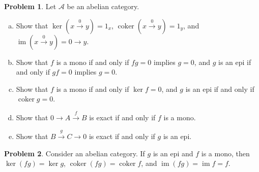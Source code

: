 \documentclass[11pt]{article}
\DeclareMathOperator{\coker}{coker}
\DeclareMathOperator{\im}{im}
\theoremstyle{definition}
\newtheorem{problem}{Problem}
\begin{document}
\vfill

\begin{problem} Let $\mathcal{A}$ be an abelian category.
	\begin{enumerate}[a)]
		\item Show that $\ker(x \xrightarrow{0} y) = 1_x$,  $\coker(x \xrightarrow{0} y) = 1_y$, and $\im(x \xrightarrow{0} y) = 0 \longrightarrow y$.
		\item Show that $f$ is a mono if and only if $fg = 0$ implies $g = 0$, and $g$ is an epi if and only if $gf = 0$ implies $g = 0$.
		\item Show that $f$ is a mono if and only if $\ker f = 0$, and $g$ is an epi if and only if $\coker g = 0$.
		\item Show that $0 \longrightarrow A \xrightarrow{\, f \,} B$ is exact if and only if $f$ is a mono.
		\item Show that $B \xrightarrow{\, g \,} C \longrightarrow 0$ is exact if and only if $g$ is an epi.
	\end{enumerate}
\end{problem}



\vfill

\begin{problem}
Consider an abelian category. If $g$ is an epi and $f$ is a mono, then $\ker (fg) = \ker g$, $\coker(fg) = \coker f$, and $\im (fg) = \im f = f$.
\end{problem}


\newpage


\noindent
{} 

\vspace{1em}
\end{document}
